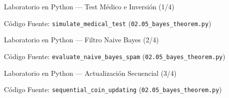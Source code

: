 \documentclass[10pt, aspectratio=169]{beamer}
\begin{document}
\begin{frame}[fragile]{Laboratorio en Python --- Test Médico e Inversión (1/4)}
  \vspace{-0.1cm}
  \begin{block}{Código Fuente: \texttt{simulate\_medical\_test} (\texttt{02.05\_bayes\_theorem.py})}
    
  \end{block}
\end{frame}

\begin{frame}[fragile]{Laboratorio en Python --- Filtro Naive Bayes (2/4)}
  \vspace{-0.1cm}
  \begin{block}{Código Fuente: \texttt{evaluate\_naive\_bayes\_spam} (\texttt{02.05\_bayes\_theorem.py})}
    
  \end{block}
\end{frame}

\begin{frame}[fragile]{Laboratorio en Python --- Actualización Secuencial (3/4)}
  \vspace{-0.1cm}
  \begin{block}{Código Fuente: \texttt{sequential\_coin\_updating} (\texttt{02.05\_bayes\_theorem.py})}
    
  \end{block}
\end{frame}
\end{document}
